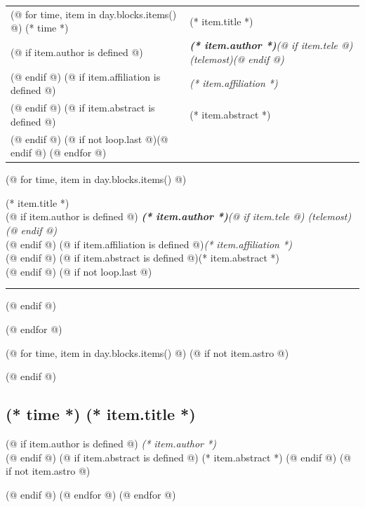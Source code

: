\documentclass[a4paper]{report}
\begin{document}
        \begin{tabularx}{\textwidth}{>{}p{2cm} >{\RaggedRight}X}
            \toprule
            (@ for time, item in day.blocks.items() @)
                {\Large (* time *)} & {\Large (* item.title *)} \\
                    (@ if item.author is defined @)
                        & \textit{\textbf{(* item.author *)}(@ if item.tele @) (telemost)(@ endif @)} \\
                    (@ endif @)
                    (@ if item.affiliation is defined @)
                        & \textit{(* item.affiliation *)} \\
                    (@ endif @)
                    (@ if item.abstract is defined @)
                        & (* item.abstract *) \\
                    (@ endif @)
                    (@ if not loop.last @)\midrule(@ endif @)
            (@ endfor @)
            \bottomrule
        \end{tabularx}

        \begin{description}
            (@ for time, item in day.blocks.items() @)
                \item[(* time *)]
                    {\Large (* item.title *)} \\[1ex]
                    (@ if item.author is defined @)
                        \textit{\textbf{(* item.author *)}(@ if item.tele @) (telemost)(@ endif @)} \\%
                    (@ endif @)
                    (@ if item.affiliation is defined @)\textit{(* item.affiliation *)} \\[1ex](@ endif @)
                    (@ if item.abstract is defined @)(* item.abstract *) \\(@ endif @)
                    (@ if not loop.last @)\rule{\paperwidth}{0.4pt}(@ endif @)

            (@ endfor @)
        \end{description}


        (@ for time, item in day.blocks.items() @)
            (@ if not item.astro @)
                \begin{tcolorbox}
            (@ endif @)
                \subsection{(* time *) \hfill (* item.title *)}
                (@ if item.author is defined @)
                    \hfill \textit{(* item.author *)} \\
                (@ endif @)
                (@ if item.abstract is defined @)
                    (* item.abstract *)
                (@ endif @)
            (@ if not item.astro @)
                \end{tcolorbox}
            (@ endif @)
        (@ endfor @)
    (@ endfor @)
\end{document}
